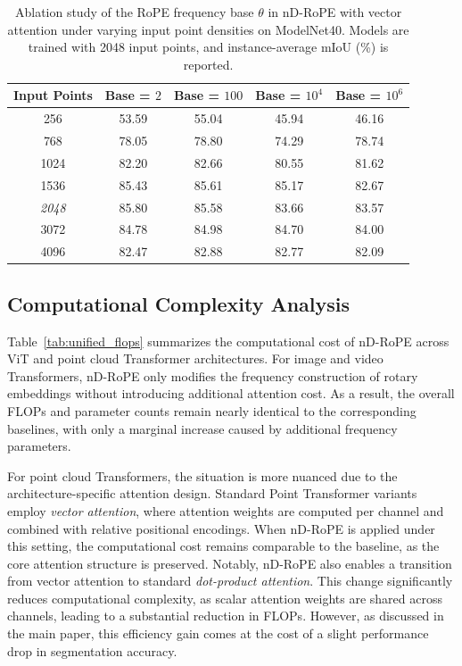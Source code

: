 \documentclass{article}
\theoremstyle{plain}
\theoremstyle{definition}
\theoremstyle{remark}
\begin{document}
\begin{table}[t]
\centering
\caption{Ablation study of the RoPE frequency base $\theta$ in nD-RoPE with vector attention under varying input point densities on ModelNet40. Models are trained with 2048 input points, and instance-average mIoU (\%) is reported.}
\label{tab:modelnet40_frequency_base}
\begin{tabular}{c@{\quad}cccc}
\toprule
Input Points
& Base = $2$
& Base = $100$
& Base = $10^{4}$
& Base = $10^{6}$ \\
\midrule
256   & 53.59 & 55.04 & 45.94 & 46.16 \\
768   & 78.05 & 78.80 & 74.29 & 78.74 \\
1024  & 82.20 & 82.66 & 80.55 & 81.62 \\
1536  & 85.43 & 85.61 & 85.17 & 82.67 \\
\textit{2048} & 85.80 & 85.58 & 83.66 & 83.57 \\
3072  & 84.78 & 84.98 & 84.70 & 84.00 \\
4096  & 82.47 & 82.88 & 82.77 & 82.09 \\
\bottomrule
\end{tabular}
\end{table}

\subsection{Computational Complexity Analysis}
\label{ap:computational_analysis}
Table~\ref{tab:unified_flops} summarizes the computational cost of nD-RoPE across ViT and point cloud Transformer architectures. For image and video Transformers, nD-RoPE only modifies the frequency construction of rotary embeddings without introducing additional attention cost. As a result, the overall FLOPs and parameter counts remain nearly identical to the corresponding baselines, with only a marginal increase caused by additional frequency parameters.

For point cloud Transformers, the situation is more nuanced due to the
architecture-specific attention design. Standard Point Transformer variants
employ \emph{vector attention}, where attention weights are computed per channel
and combined with relative positional encodings. When nD-RoPE is applied under
this setting, the computational cost remains comparable to the baseline, as the
core attention structure is preserved. Notably, nD-RoPE also enables a transition from vector attention to standard \emph{dot-product attention}. This change significantly reduces computational complexity, as scalar attention weights are shared across channels, leading to a substantial reduction in FLOPs. However, as discussed in the main paper, this efficiency gain comes at the cost of a slight performance drop in segmentation accuracy.
\end{document}
